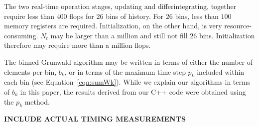 The two real-time operation stages, updating and differintegrating,
together require less than $400$ flops for $26$ bins of
history. For $26$ bins, less than $100$ memory registers are
required. Initialization, on the other hand, is very
resource-consuming. $N_t$ may be larger than a million and still not
fill $26$ bins. Initialization therefore may require more than a
million flops.

The binned Grunwald algorithm may be written in terms of either the
number of elements per bin, $b_k$, or in terms of the maximum time
step $p_k$ included within each bin (see
Equation~\ref{eqn:sumWk}). While we explain our algorithms in terms of
$b_k$ in this paper, the results derived from our C++ code were
obtained using the $p_k$ method.

{\bf INCLUDE ACTUAL TIMING MEASUREMENTS}
